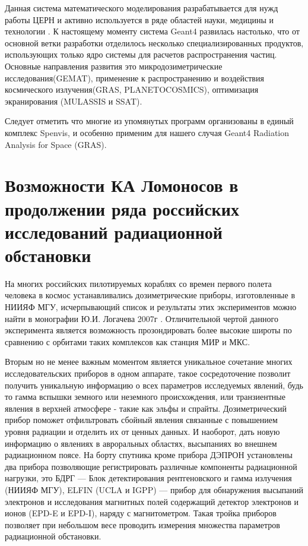 Данная система математического моделирования разрабатывается для нужд работы 
ЦЕРН и активно используется в ряде областей науки, медицины и технологии 
\cite{Agostinelli2003}.
К настоящему моменту система Geant4 развилась настолько, что от основной ветки 
разработки отделилось несколько специализированных продуктов, использующих 
только ядро системы для расчетов распространения частиц. Основные направления 
развития это микродозиметрические исследования(GEMAT), применение к 
распространению и 
воздействия космического излучения(GRAS, PLANETOCOSMICS), оптимизация 
экранирования (MULASSIS \cite{Lei2002} и SSAT). 

Следует отметить что многие из упомянутых программ организованы в единый комплекс Spenvis,
 и особенно применим для нашего случая  Geant4 Radiation Analysis for Space (GRAS).

\section{Возможности КА Ломоносов в продолжении ряда российских исследований радиационной обстановки}

На многих российских пилотируемых кораблях со времен первого полета человека в космос устанавливались дозиметрические приборы, изготовленные в НИИЯФ МГУ, исчерпывающий список и результаты этих экспериментов можно найти в монографии Ю.И. Логачева 2007г \cite{logachev2007}. Отличительной чертой данного эксперимента является возможность прозондировать более высокие широты по сравнению с орбитами таких комплексов как станция МИР и МКС. 

Вторым но не менее важным моментом является уникальное сочетание многих исследовательских приборов в одном аппарате, такое сосредоточение позволит получить уникальную информацию о всех параметров исследуемых явлений, будь то гамма вспышки земного или неземного происхождения, или транзиентные явления в верхней атмосфере - такие как эльфы и спрайты. Дозиметрический прибор поможет отфильтровать сбойный явления связанные с повышением уровня радиации и отделить их от ценных данных. И наоборот, дать новую информацию о явлениях в авроральных областях, высыпаниях во внешнем радиационном поясе.
На борту спутника кроме прибора ДЭПРОН установлены два прибора позволяющие регистрировать различные компоненты радиационной нагрузки, это БДРГ --- Блок детектирования рентгеновского и гамма излучения (НИИЯФ МГУ), ELFIN (UCLA и IGPP) --- прибор для обнаружения высыпаний электронов и исследования магнитных полей содержащий детектор электронов и ионов (EPD-E и EPD-I), наряду с магнитометром. Такая тройка приборов позволяет при небольшом весе проводить измерения множества  параметров радиационной обстановки.




